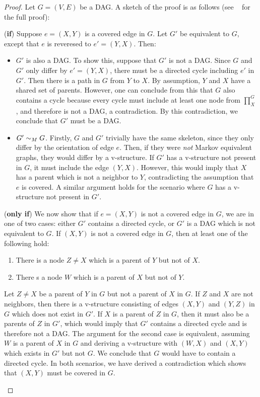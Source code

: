 \begin{proof}
Let $G = (V,E)$ be a DAG. A sketch of the proof is as follows (see ~\cite{chickering} for the full proof):
	\begin{myindentpar}{1em}
	(\textbf{if}) Suppose $e = (X,Y)$ is a covered edge in $G$. Let $G'$ be equivalent to $G$, except that $e$ is reveresed to $e' = (Y,X)$. Then:
		\begin{itemize}
		\item $G'$ is also a DAG. To show this, suppose that $G'$ is not a DAG. Since $G$ and $G'$ only differ by $e' = (Y,X)$, there must be a directed cycle including $e'$ in $G'$. Then there is a path in $G$ from $Y$ to $X$. By assumption, $Y$ and $X$ have a shared set of parents. However, one can conclude from this that $G$ also contains a cycle because every cycle must include at least one node from $\prod\nolimits_{X}^{G}$, and therefore is not a DAG, a contradiction. By this contradiction, we conclude that $G'$ must be a DAG. 
		\item $G' \sim_{M} G$. Firstly, $G$ and $G'$ trivially have the same skeleton, since they only differ by the orientation of edge $e$. Then, if they were \textit{not} Markov equivalent graphs, they would differ by a v-structure. If $G'$ has a v-structure not present in $G$, it must include the edge $(Y,X)$. However, this would imply that $X$ has a parent which is not a neighbor to $Y$, contradicting the assumption that $e$ is covered. A similar argument holds for the scenario where $G$ has a v-structure not present in $G'$. 
		\end{itemize}
	
	(\textbf{only if}) We now show that if $e=(X,Y)$ is not a covered edge in $G$, we are in one of two cases: either $G'$ contains a directed cycle, or $G'$ is a DAG which is not equivalent to $G$. If $(X,Y)$ is not a covered edge in $G$, then at least one of the following hold:
	\begin{enumerate}
		\item There is a node $Z \neq X$ which is a parent of $Y$ but not of $X$. 
		\item There s a node $W$ which is a parent of $X$ but not of $Y$. 
	\end{enumerate}
	Let $Z \neq X$ be a parent of $Y$ in $G$ but not a parent of $X$ in $G$. If $Z$ and $X$ are not neighbors, then there is a v-structure consisting of edges $(X,Y)$ and $(Y,Z)$ in $G$ which does not exist in $G'$. If $X$ is a parent of $Z$ in $G$, then it must also be a parents of $Z$ in $G'$, which would imply that $G'$ contains a directed cycle and is therefore not a DAG. \newline
	\null \quad \quad The argument for the second case is equivalent, assuming $W$ is a parent of $X$ in $G$ and deriving a v-structure with $(W,X)$ and $(X,Y)$ which exists in $G'$ but not $G$. We conclude that $G$ would have to contain a directed cycle. In both scenarios, we have derived a contradiction which shows that $(X,Y)$ must be covered in $G$. \qedhere


\end{myindentpar}
\end{proof}



